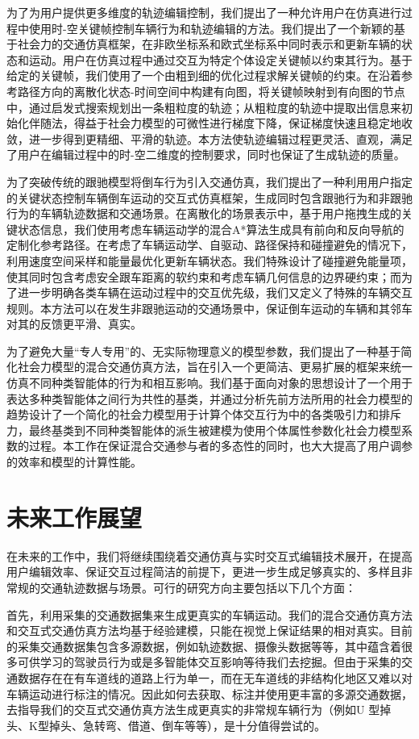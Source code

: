 为了为用户提供更多维度的轨迹编辑控制，我们提出了一种允许用户在仿真进行过程中使用时-空关键帧控制车辆行为和轨迹编辑的方法。我们提出了一个新颖的基于社会力的交通仿真框架，在非欧坐标系和欧式坐标系中同时表示和更新车辆的状态和运动。用户在仿真过程中通过交互为特定个体设定关键帧以约束其行为。基于给定的关键帧，我们使用了一个由粗到细的优化过程求解关键帧的约束。在沿着参考路径方向的离散化状态-时间空间中构建有向图，将关键帧映射到有向图的节点中，通过启发式搜索规划出一条粗粒度的轨迹；从粗粒度的轨迹中提取出信息来初始化伴随法，得益于社会力模型的可微性进行梯度下降，保证梯度快速且稳定地收敛，进一步得到更精细、平滑的轨迹。本方法使轨迹编辑过程更灵活、直观，满足了用户在编辑过程中的时-空二维度的控制要求，同时也保证了生成轨迹的质量。

为了突破传统的跟驰模型将倒车行为引入交通仿真，我们提出了一种利用用户指定的关键状态控制车辆倒车运动的交互式仿真框架，生成同时包含跟驰行为和非跟驰行为的车辆轨迹数据和交通场景。在离散化的场景表示中，基于用户拖拽生成的关键状态信息，我们使用考虑车辆运动学的混合A*算法生成具有前向和反向导航的定制化参考路径。在考虑了车辆运动学、自驱动、路径保持和碰撞避免的情况下，利用速度空间采样和能量最优化更新车辆状态。我们特殊设计了碰撞避免能量项，使其同时包含考虑安全跟车距离的软约束和考虑车辆几何信息的边界硬约束；而为了进一步明确各类车辆在运动过程中的交互优先级，我们又定义了特殊的车辆交互规则。本方法可以在发生非跟驰运动的交通场景中，保证倒车运动的车辆和其邻车对其的反馈更平滑、真实。

为了避免大量“专人专用”的、无实际物理意义的模型参数，我们提出了一种基于简化社会力模型的混合交通仿真方法，旨在引入一个更简洁、更易扩展的框架来统一仿真不同种类智能体的行为和相互影响。我们基于面向对象的思想设计了一个用于表达多种类智能体之间行为共性的基类，并通过分析先前方法所用的社会力模型的趋势设计了一个简化的社会力模型用于计算个体交互行为中的各类吸引力和排斥力，最终基类到不同种类智能体的派生被建模为使用个体属性参数化社会力模型系数的过程。本工作在保证混合交通参与者的多态性的同时，也大大提高了用户调参的效率和模型的计算性能。


\section{未来工作展望}

在未来的工作中，我们将继续围绕着交通仿真与实时交互式编辑技术展开，在提高用户编辑效率、保证交互过程简洁的前提下，更进一步生成足够真实的、多样且非常规的交通轨迹数据与场景。可行的研究方向主要包括以下几个方面：

首先，利用采集的交通数据集来生成更真实的车辆运动。我们的混合交通仿真方法和交互式交通仿真方法均基于经验建模，只能在视觉上保证结果的相对真实。目前的采集交通数据集包含多源数据，例如轨迹数据、摄像头数据等等，其中蕴含着很多可供学习的驾驶员行为或是多智能体交互影响等待我们去挖掘。但由于采集的交通数据存在在有车道线的道路上行为单一，而在无车道线的非结构化地区又难以对车辆运动进行标注的情况。因此如何去获取、标注并使用更丰富的多源交通数据，去指导我们的交互式交通仿真方法生成更真实的非常规车辆行为（例如U 型掉头、K型掉头、急转弯、借道、倒车等等），是十分值得尝试的。

